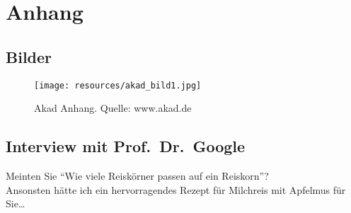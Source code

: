 \chapter{Anhang}

\section{Bilder}
\begin{figure}[H]
  \begin{center}
    \texttt{[image: resources/akad\_bild1.jpg]}
    \caption[Akad Anhang]{Akad Anhang. Quelle: www.akad.de}
  \end{center}
\end{figure}

\section{Interview mit Prof.~Dr.~Google}
\begin{faq}
  {Meinten Sie ``Wie viele Reiskörner passen auf ein Reiskorn''?\\
    Ansonsten hätte ich ein hervorragendes Rezept für Milchreis mit Apfelmus für Sie\ldots}
\end{faq}

%